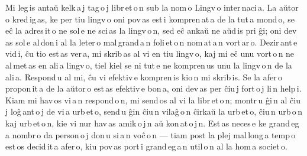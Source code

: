 Mi leg\,is antaŭ kelk\,a\,j tag\,o\,j libr\,et\,o\,n sub la nom\,o \glqq{}Lingv\,o inter\,naci\,a\grqq{}. La aŭtor\,o kred\,ig\,as, ke per tiu lingv\,o oni pov\,as est\,i kompren\,at\,a de la tut\,a mond\,o, se eĉ la adres\,it\,o ne sol\,e ne sci\,as la lingv\,o\,n, sed eĉ ankaŭ ne aŭd\,is pri ĝi; oni dev\,as sol\,e al\,don\,i al la leter\,o mal\,grand\,a\,n foli\,et\,o\,n nom\,at\,a\,n \glqq{}vort\,ar\,o\grqq{}. Dezir\,ant\,e vid\,i, ĉu tio est\,as ver\,a, mi skrib\,as al vi en tiu lingv\,o, kaj mi eĉ unu vort\,o\,n ne al\,met\,as en ali\,a lingv\,o, tiel kiel se ni tut\,e ne kompren\,us unu la lingv\,o\,n de la ali\,a. Respond\,u al mi, ĉu vi efektiv\,e kompren\,is kio\,n mi skrib\,is. Se la afer\,o propon\,it\,a de la aŭtor\,o est\,as efektiv\,e bon\,a, oni dev\,as per ĉiu\,j fort\,o\,j li\,n help\,i. Kiam mi hav\,os vi\,a\,n respond\,o\,n, mi send\,os al vi la libr\,et\,o\,n; montr\,u ĝi\,n al ĉiu\,j loĝ\,ant\,o\,j de vi\,a urb\,et\,o, send\,u ĝin ĉiu\,n vilaĝ\,o\,n ĉirkaŭ la urb\,et\,o, ĉiu\,n urb\,o\,n kaj urb\,et\,o\,n, kie vi nur hav\,as amik\,o\,j\,n aŭ kon\,at\,o\,j\,n. Est\,as neces\,e ke grand\,eg\,a nombr\,o da person\,o\,j don\,u si\,a\,n voĉ\,o\,n --- tiam post la plej mal\,long\,a temp\,o est\,os decid\,it\,a afer\,o, kiu pov\,as port\,i grand\,eg\,a\,n util\,o\,n al la hom\,a societ\,o.

